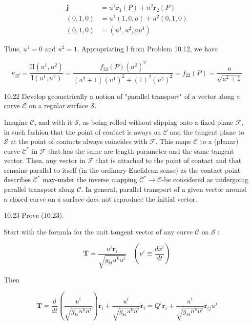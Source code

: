 \documentclass[10pt]{article}
\begin{document}
$$
\begin{aligned}
\mathbf{j} & =u^{1} \mathbf{r}_{1}(P)+u^{2} \mathbf{r}_{2}(P) \\
(0,1,0) & =u^{1}(1,0, a)+u^{2}(0,1,0) \\
(0,1,0) & =\left(u^{1}, u^{2}, a u^{1}\right)
\end{aligned}
$$

Thus, $u^{1}=0$ and $u^{2}=1$. Appropriating I from Problem 10.12, we have

$$
\kappa_{g f}=\frac{\mathrm{II}\left(u^{1}, u^{2}\right)}{\mathrm{I}\left(u^{1}, u^{2}\right)}=\frac{f_{22}(P)\left(u^{2}\right)^{2}}{\left(a^{2}+1\right)\left(u^{1}\right)^{2}+(1)^{2}\left(u^{2}\right)^{2}}=f_{22}(P)=\frac{a}{\sqrt{a^{2}+1}}
$$

10.22 Develop geometrically a notion of "parallel transport" of a vector along a curve $\mathscr{C}$ on a regular surface $\mathscr{S}$.

Imagine $\mathscr{C}$, and with it $\mathscr{S}$, as being rolled without slipping onto a fixed plane $\mathscr{F}$, in such fashion that the point of contact is aways on $\mathscr{C}$ and the tangent plane to $\mathscr{S}$ at the point of contacts always coincides with $\mathscr{F}$. This maps $\mathscr{C}$ to a (planar) curve $\mathscr{C}^{*}$ in $\mathscr{F}$ that has the same arc-length parameter and the same tangent vector. Then, any vector in $\mathscr{F}$ that is attached to the point of contact and that remains parallel to itself (in the ordinary Euclidean sense) as the contact point describes $\mathscr{C}^{*}$ may-under the inverse mapping $\mathscr{C}^{*} \rightarrow \mathscr{C}$-be considered as undergoing parallel transport along $\mathscr{C}$. In general, parallel transport of a given vector around a closed curve on a surface does not reproduce the initial vector.

10.23 Prove (10.23).

Start with the formula for the unit tangent vector of any curve $\mathscr{C}$ on $\mathscr{S}$ :

$$
\mathbf{T}=\frac{u^{i} \mathbf{r}_{i}}{\sqrt{g_{k l} u^{k} u^{i}}} \quad\left(u^{i} \equiv \frac{d x^{i}}{d t}\right)
$$

Then


\begin{equation*}
\dot{\mathbf{T}}=\frac{d}{d t}\left(\frac{u^{i}}{\sqrt{g_{k l} u^{k} u^{l}}}\right) \mathbf{r}_{i}+\frac{u^{i}}{\sqrt{g_{k l} u^{k} u^{l}}} \dot{\mathbf{r}}_{i}=Q^{i} \mathbf{r}_{i}+\frac{u^{i}}{\sqrt{g_{k l} u^{k} u^{l}}} \mathbf{r}_{i j} u^{j} \tag{1}
\end{equation*}
\end{document}
